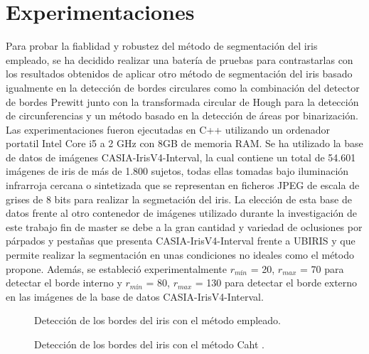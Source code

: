 \section{Experimentaciones}

Para probar la fiablidad y robustez del método de segmentación del iris empleado, se ha decidido realizar una batería de pruebas para contrastarlas con los resultados obtenidos de aplicar otro método de segmentación del iris basado igualmente en la detección de bordes circulares como la combinación del detector de bordes Prewitt junto con la transformada circular de Hough para la detección de circunferencias y un método basado en la detección de áreas por binarización. Las experimentaciones fueron ejecutadas en C++ utilizando un ordenador portatil Intel Core i5 a 2 GHz con 8GB de memoria RAM. Se ha utilizado la base de datos de imágenes CASIA-IrisV4-Interval, la cual contiene un total de 54.601 imágenes de iris de más de 1.800 sujetos, todas ellas tomadas bajo iluminación infrarroja cercana o sintetizada que se representan en ficheros JPEG de escala de grises de 8 bits para realizar la segmetación del iris. La elección de esta base de datos frente al otro contenedor de imágenes utilizado durante la investigación de este trabajo fin de master se debe a la gran cantidad y variedad de oclusiones por párpados y pestañas que presenta CASIA-IrisV4-Interval frente a UBIRIS y que permite realizar la segmentación en unas condiciones no ideales como el método propone. Además, se estableció experimentalmente $r_{mín}$ = 20, $r_{max}$ = 70 para detectar el borde interno y $r_{mín}$ = 80, $r_{max}$ = 130 para detectar el borde externo en las imágenes de la base de datos CASIA-IrisV4-Interval. \\ 

\begin{figure}[htbp]
\centering
{}
\caption{Detección de los bordes del iris con el método empleado.} \label{fig:señales}
\end{figure}

\begin{figure}[htbp]
\centering
{}
\caption{Detección de los bordes del iris con el método Caht .} \label{fig:señales}
\end{figure}

